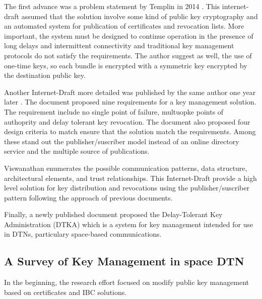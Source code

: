 The first advance was a problem statement by Templin in 2014  \cite{templin-dtnskmps-00}. This internet-draft assumed that the solution involve some kind of public key cryptography and an automated system for publication of certificates and revocation lists. More important, the system must be designed to continue operation in the presence of long delays and intermittent connectivity and traditional key management protocols do not satisfy the requirements. The author suggest as well, the use of one-time keys, so each bundle is encrypted with a symmetric key encrypted by the destination public key. 

Another Internet-Draft more detailed was published by the same author one year later \cite{templin-dtnskmreq-00}. The document proposed nine requirements for a key management solution. The requirement include no single point of failure, multuopke points of authoprity and delay tolerant key revocation. The document also proposed four design criteria to match ensure that the solution match the requirements. Among these stand out the publisher/suscriber model instead of an online directory service and the multiple source of publications. 

Viswanathan \cite{viswanathan-dtn-pkdn-00} enumerates the possible communication patterns, data structure, architectural elements, and trust relationships.  This Internet-Draft provide a high level solution for key distribution and revocations using the publisher/suscriber pattern following the approach of previous documents.

Finally, a newly published document proposed the Delay-Tolerant Key Administration (DTKA) which is a system for key management intended for use in DTNs, particulary space-based communications. 



\subsection{A Survey of Key Management in space DTN}

In the beginning, the research effort focused on modify public key management based on certificates and IBC solutions. 





